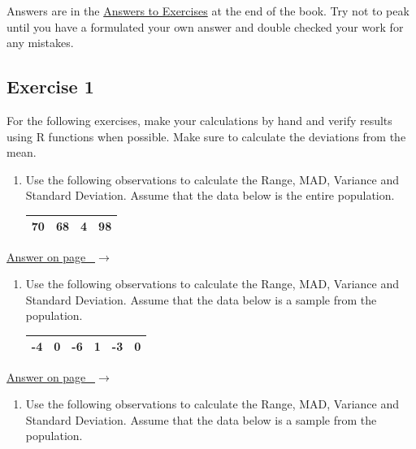 \documentclass[
  11pt,
  letterpaper,
  DIV=11,
  numbers=noendperiod,
  oneside,
  open=any]{scrreprt}
\providecommand{\tightlist}{%
  \setlength{\itemsep}{0pt}\setlength{\parskip}{0pt}}\usepackage{longtable,booktabs,array}
\newcommand{\bsanswerref}[1]{%
  \par\nopagebreak\hypertarget{q-#1}{}\label{q-#1}%
  {\raggedleft\sffamily\footnotesize\hyperlink{a-#1}{\textcolor{bsaccent}{Answer on page \pageref{a-#1}\ $\rightarrow$}}\par}%
  \medskip}
\begin{document}
Answers are in the \hyperref[answers]{Answers to Exercises} at the end
of the book. Try not to peak until you have a formulated your own answer
and double checked your work for any mistakes.

\subsection*{Exercise 1}\label{exercise-1-3}

For the following exercises, make your calculations by hand and verify
results using R functions when possible. Make sure to calculate the
deviations from the mean.

\begin{enumerate}
\def\labelenumi{\arabic{enumi}.}
\item
  Use the following observations to calculate the Range, MAD, Variance
  and Standard Deviation. Assume that the data below is the entire
  population.

  \begin{center}
  \begin{tabular}{cccc}
  \toprule
  70 & 68 & 4 & 98 \\
  \bottomrule
  \end{tabular}
  \end{center}
\end{enumerate}

\bsanswerref{bsans31}

\begin{enumerate}
\def\labelenumi{\arabic{enumi}.}
\setcounter{enumi}{1}
\item
  Use the following observations to calculate the Range, MAD, Variance
  and Standard Deviation. Assume that the data below is a sample from
  the population.

  \begin{center}
  \begin{tabular}{cccccc}
  \toprule
  -4 & 0 & -6 & 1 & -3 & 0 \\
  \bottomrule
  \end{tabular}
  \end{center}
\end{enumerate}

\bsanswerref{bsans32}

\begin{enumerate}
\def\labelenumi{\arabic{enumi}.}
\setcounter{enumi}{2}
\tightlist
\item
  Use the following observations to calculate the Range, MAD, Variance
  and Standard Deviation. Assume that the data below is a sample from
  the population.
\end{enumerate}
\end{document}
